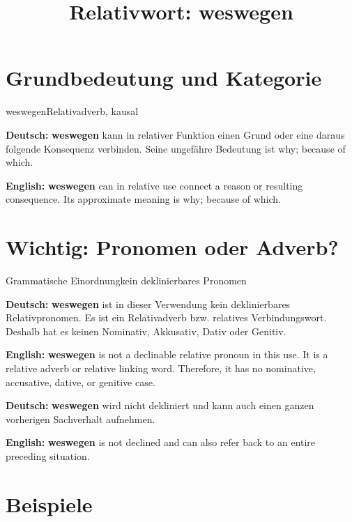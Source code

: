 \documentclass[a4paper,11pt]{article}
\title{Relativwort: \glqq weswegen\grqq{}}
\date{}
\newcommand{\GermanText}[1]{\textbf{Deutsch: }#1\par}
\newcommand{\EnglishText}[1]{{\small\color{SoftGray}\textbf{English: }#1\par}}
\begin{document}
\maketitle

\tableofcontents

\newpage

\section{Grundbedeutung und Kategorie}

\begin{grammarentry}{weswegen}{Relativadverb, kausal}

\GermanText{\textbf{weswegen} kann in relativer Funktion einen Grund oder eine daraus folgende Konsequenz verbinden. Seine ungefähre Bedeutung ist \glqq why; because of which\grqq{}.}

\EnglishText{\textbf{weswegen} can in relative use connect a reason or resulting consequence. Its approximate meaning is \glqq why; because of which\grqq{}.}

\end{grammarentry}

\section{Wichtig: Pronomen oder Adverb?}

\begin{grammarentry}{Grammatische Einordnung}{kein deklinierbares Pronomen}

\GermanText{\textbf{weswegen} ist in dieser Verwendung kein deklinierbares Relativpronomen. Es ist ein Relativadverb bzw. relatives Verbindungswort. Deshalb hat es keinen Nominativ, Akkusativ, Dativ oder Genitiv.}

\EnglishText{\textbf{weswegen} is not a declinable relative pronoun in this use. It is a relative adverb or relative linking word. Therefore, it has no nominative, accusative, dative, or genitive case.}

\GermanText{\textbf{weswegen} wird nicht dekliniert und kann auch einen ganzen vorherigen Sachverhalt aufnehmen.}

\EnglishText{\textbf{weswegen} is not declined and can also refer back to an entire preceding situation.}

\end{grammarentry}

\section{Beispiele}
\end{document}
